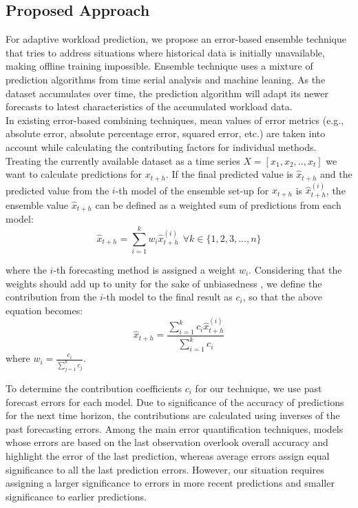 \subsection{Proposed Approach}

For adaptive workload prediction, we propose an error-based ensemble technique that tries to address situations where historical data is initially unavailable, making offline training impossible. Ensemble technique uses a mixture of prediction algorithms from time serial analysis and machine leaning. As the dataset accumulates over time, the prediction algorithm will adapt its newer forecasts to latest characteristics of the accumulated workload data.\\

In existing error-based combining techniques, mean values of error metrics (e.g., absolute error, absolute percentage error, squared error, etc.) are taken into account while calculating the contributing factors for individual methods. 
Treating the currently available dataset as a time series
$X=[x_{1},x_{2},.. , x_{t}]$
we want to calculate predictions for $x_{t+h}$. If the final predicted value is $\hat{x}_{t+h}$ and the predicted value from the $i$-th model of the ensemble set-up for $x_{t+h}$ is $\hat{x}_{t+h}^{(i)}$, the ensemble value $\hat{x}_{t+h}$ can be defined as a weighted sum of predictions from each model:
\begin{equation}
\hat{x}_{t+h}= \sum_{i=1}^{k}w_i \hat{x}_{t+h}^{(i)} \ \ \forall k \in \{1,2,3,...,n\}
\end{equation}

where the $i$-th forecasting method is assigned a weight $w_i$. Considering that the weights should add up to unity for the sake of unbiasedness \cite{Adhikari_2012}, we define the contribution from the $i$-th model to the final result as $c_i$, so that the above equation becomes:
\begin{equation}
\hat{x}_{t+h}= \frac{\sum_{i=1}^{k}c_i \hat{x}_{t+h}^{(i)}}{\sum_{i=1}^{k}c_i}
\end{equation}
where $w_{i}= \frac{c_{i}}{\sum_{j=1}^{k}c_j}$.

To determine the contribution coefficients $c_i$ for our technique, we use past forecast errors for each model. Due to significance of the accuracy of predictions for the next time horizon, the contributions are calculated using inverses of the past forecasting errors. Among the main error quantification techniques, models whose errors are based on the last observation overlook overall accuracy and highlight the error of the last prediction, whereas  average errors assign equal significance to all the last prediction errors. However, our situation requires assigning a larger significance to errors in more recent predictions and smaller significance to earlier predictions.

